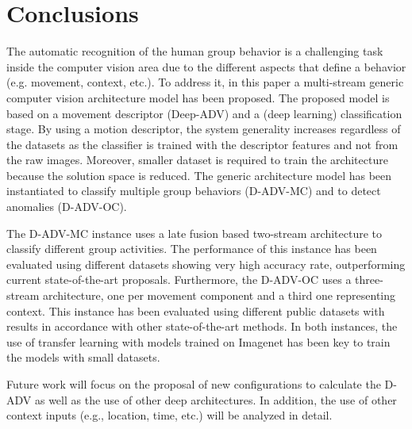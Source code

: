 \section{Conclusions} \label{sec:concl}

The automatic recognition of the human group behavior is a challenging task inside the computer vision area due to the different aspects that define a behavior (e.g. movement, context, etc.). To address it, in this paper a multi-stream generic computer vision architecture model has been proposed. The proposed model is based on a movement descriptor (Deep-ADV) and a (deep learning) classification stage. By using a motion descriptor, the system generality increases regardless of the datasets as the classifier is trained with the descriptor features and not from the raw images. Moreover, smaller dataset is required to train the architecture because the solution space is reduced. The generic architecture model has been instantiated to classify multiple group behaviors (D-ADV-MC) and to detect anomalies (D-ADV-OC).

The D-ADV-MC instance uses a late fusion based two-stream architecture to classify different group activities. The performance of this instance has been evaluated using different datasets showing very high accuracy rate, outperforming current state-of-the-art proposals. Furthermore, the D-ADV-OC uses a three-stream architecture, one per movement component and a third one representing context. This instance has been evaluated using different public datasets with results in accordance with other state-of-the-art methods. In both instances, the use of transfer learning with models trained on Imagenet has been key to train the models with small datasets.

Future work will focus on the proposal of new configurations to calculate the D-ADV as well as the use of other deep architectures. In addition, the use of other context inputs (e.g., location, time, etc.) will be analyzed in detail.
